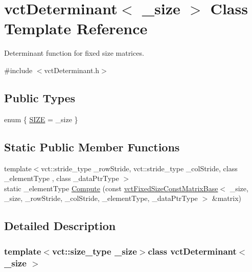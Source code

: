 \hypertarget{classvct_determinant}{}\section{vct\+Determinant$<$ \+\_\+size $>$ Class Template Reference}
\label{classvct_determinant}


Determinant function for fixed size matrices.  




{\ttfamily \#include $<$vct\+Determinant.\+h$>$}

\subsection*{Public Types}
\begin{DoxyCompactItemize}
\item 
enum \{ \hyperlink{classvct_determinant_a0d11bb9b2c0545dde730acad696bb723af5935306ad86f093f0b4b547d12cf2c6}{S\+I\+Z\+E} = \+\_\+size
 \}
\end{DoxyCompactItemize}
\subsection*{Static Public Member Functions}
\begin{DoxyCompactItemize}
\item 
{\footnotesize template$<$vct\+::stride\+\_\+type \+\_\+row\+Stride, vct\+::stride\+\_\+type \+\_\+col\+Stride, class \+\_\+element\+Type , class \+\_\+data\+Ptr\+Type $>$ }\\static \+\_\+element\+Type \hyperlink{classvct_determinant_ae742f09944e4c45d2965af557b8d818e}{Compute} (const \hyperlink{classvct_fixed_size_const_matrix_base}{vct\+Fixed\+Size\+Const\+Matrix\+Base}$<$ \+\_\+size, \+\_\+size, \+\_\+row\+Stride, \+\_\+col\+Stride, \+\_\+element\+Type, \+\_\+data\+Ptr\+Type $>$ \&matrix)
\end{DoxyCompactItemize}


\subsection{Detailed Description}
\subsubsection*{template$<$vct\+::size\+\_\+type \+\_\+size$>$class vct\+Determinant$<$ \+\_\+size $>$}

